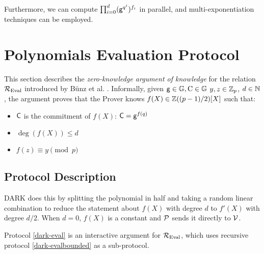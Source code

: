 Furthermore, we can compute $\prod_{i=0}^d (\mathsf{g}^{q^i})^{f_i}$ in parallel, and multi-exponentiation techniques \cite{yen2012multi, borges2017parallel} can be employed.

\section{Polynomials Evaluation Protocol}

This section describes the \textit{zero-knowledge argument of knowledge} for the relation $\mathcal{R}_{\mathrm{Eval}}$ introduced by B\"unz et al. \cite{bunz2020transparent}. Informally, given $\mathsf{g} \in \mathbb{G}, \mathrm{C} \in \mathbb{G}$ $y, z \in \mathbb{Z}_p$, $d \in \mathbb{N}$, the argument proves that the Prover knows $f(X) \in \mathbb{Z}((p-1)/2)[X]$ such that:
\begin{itemize}
    \item $\mathsf{C}$ is the commitment of $f(X)$: $\mathsf{C} = \mathsf{g}^{f(q)}$
    \item $\deg(f(X)) \le d$
    \item $f(z) \equiv y \pmod p$
\end{itemize}

\subsection{Protocol Description}

DARK does this by splitting the polynomial in half and taking a random linear combination to reduce the statement about $f(X)$ with degree $d$ to $f'(X)$ with degree $d/2$. When $d = 0$, $f(X)$ is a constant and $\mathcal{P}$ sends it directly to $\mathcal{V}$.

Protocol \ref{dark-eval} is an interactive argument for $\mathcal{R}_{\mathrm{Eval}}$, which uses recursive protocol \ref{dark-evalbounded} as a sub-protocol.


